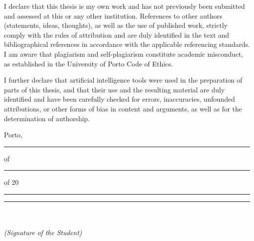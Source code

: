 

I declare that this thesis is my own work and has not previously been submitted and assessed at this or any other institution. References to other authors (statements, ideas, thoughts), as well as the use of published work, strictly comply with the rules of attribution and are duly identified in the text and bibliographical references in accordance with the applicable referencing standards. I am aware that plagiarism and self-plagiarism constitute academic misconduct, as established in the University of Porto Code of Ethics.

I further declare that artificial intelligence tools were used in the preparation of parts of this thesis, and that their use and the resulting material are duly identified and have been carefully checked for errors, inaccuracies, unfounded attributions, or other forms of bias in content and arguments, as well as for the determination of authorship.


\vspace{18mm}
\noindent Porto, \rule{16mm}{0.4pt} of \rule{42mm}{0.4pt} of 20\rule{10mm}{0.4pt}

\vspace{20mm}
\begin{center}
  \rule{0.72\linewidth}{0.4pt}\\
  \ThesisAuthor\\
  \emph{(Signature of the Student)}
\end{center}
